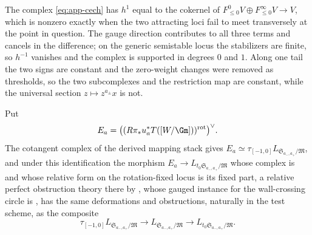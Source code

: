 \begin{remark}
\label{rem:app-degree-one}
The complex \eqref{eq:app-cech} has \(h^1\) equal to the cokernel of
\(F^0_{\leq0}V\oplus F^\infty_{\leq0}V\to V\), which is nonzero exactly when
the two attracting loci fail to meet transversely at the point in question.
The gauge direction contributes to all three terms and cancels in the
difference; on the generic semistable locus the stabilizers are finite, so
\(h^{-1}\) vanishes and the complex is supported in degrees \(0\) and \(1\).
Along one tail the two signs are constant and the zero-weight changes were
removed as thresholds, so the two subcomplexes and the restriction map are
constant, while the universal section \(z\mapsto z^{a_\pm}x\) is not.
\end{remark}

\begin{lemma}
\label{lem:app-truncation}
Put
\[
 E_a=\bigl((R\pi_*u_a^*T([W/\Gm]))^{\mathrm{rot}}\bigr)^\vee.
\]
The cotangent complex of the derived mapping stack gives
\(E_a\simeq\tau_{[-1,0]}L_{\mathfrak S_{a_-,a_+}/\mathfrak M}\), and under this
identification the morphism
\(E_a\to L_{t_0\mathfrak S_{a_-,a_+}/\mathfrak M}\) whose complex is
\cite[Definition~7.13]{WoodwardQKIII} and whose relative form on the
rotation-fixed locus is its fixed part, a relative perfect obstruction theory
there by \cite{GraberPandharipande}, whose gauged instance for the
wall-crossing circle is \cite[Corollary~3.20]{GonzalezWoodward}, has the same
deformations and obstructions, naturally in the test scheme, as the
composite
\[
 \tau_{[-1,0]}L_{\mathfrak S_{a_-,a_+}/\mathfrak M}
 \longrightarrow L_{\mathfrak S_{a_-,a_+}/\mathfrak M}
 \longrightarrow L_{t_0\mathfrak S_{a_-,a_+}/\mathfrak M}.
\]
\end{lemma}

